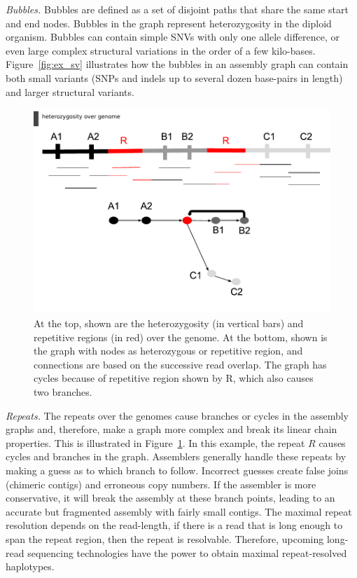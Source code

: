 \textit{Bubbles.}
Bubbles are defined as a set of disjoint paths that share the same start and end nodes.
Bubbles in the graph represent heterozygosity in the diploid organism.
Bubbles can contain simple SNVs with only one allele difference, or even large complex structural variations in the order of a few kilo-bases.  
Figure~\ref{fig:ex_sv} illustrates how the bubbles in an assembly graph can contain both small variants (SNPs and indels up to several dozen base-pairs in length) and larger structural variants.
\begin{figure}[t!]\centering
\includegraphics[width=\columnwidth]{repeats.pdf}
\caption{At the top, shown are the heterozygosity (in vertical bars) and repetitive regions (in red) over the genome. At the bottom, shown is the graph with nodes as heterozygous or repetitive region, and connections are based on the successive read overlap.
The graph has cycles because of repetitive region shown by R, which also causes two branches.}
\label{fig:repeats}
\end{figure}

\textit{Repeats.} The repeats over the genomes cause branches or cycles in the assembly graphs and, therefore, make a graph more complex and break its linear chain properties.
This is illustrated in Figure~\ref{fig:repeats}. In this example, the repeat $R$ causes cycles and branches in the graph.
Assemblers generally handle these repeats by making a guess as to which branch to follow.
Incorrect guesses create false joins (chimeric contigs) and erroneous copy numbers. 
If the assembler is more conservative, it will break the assembly at these branch points, leading to an accurate but fragmented assembly with fairly small contigs.
The maximal repeat resolution  depends on the read-length, if there is a read that is long enough to span the repeat region, then the repeat is resolvable.
Therefore, upcoming long-read sequencing technologies have the power to obtain maximal repeat-resolved haplotypes.


